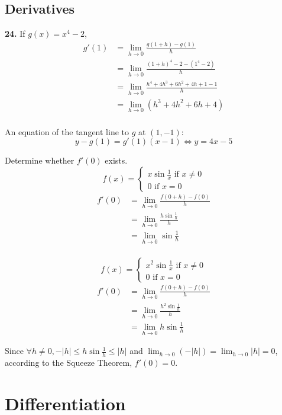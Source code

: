 \documentclass[a4paper,12pt]{article}
\begin{document}
\subsection{Derivatives}
\textbf{24. }If $g(x) = x^4 - 2$,
\begin{align*}
g'(1) &= \lim_{h \to 0}\frac{g(1 + h) - g(1)}{h}\\
      &= \lim_{h \to 0}\frac{(1 + h)^4 - 2 - (1^4 - 2)}{h}\\
      &= \lim_{h \to 0}\frac{h^4 + 4h^3 + 6h^2 + 4h + 1 - 1}{h}\\
      &= \lim_{h \to 0}(h^3 + 4h^2 + 6h + 4)\\
\end{align*}

An equation of the tangent line to $g$ at $(1, -1)$:
\[y - g(1) = g'(1)(x - 1) \iff y = 4x - 5\]

\noindent Determine whether $f'(0)$ exists.
\[f(x) = \begin{cases}
           x\sin\frac{1}{x}\text{ if } x \neq 0 \\
           0\text{ if } x = 0
         \end{cases}\tag{53}\]
\begin{align*}
f'(0) &= \lim_{h \to 0}\frac{f(0 + h) - f(0)}{h}\\
      &= \lim_{h \to 0}\frac{h\sin\frac{1}{h}}{h}\\
      &= \lim_{h \to 0}\sin\frac{1}{h}\tag{does not exist}\\
\end{align*}

\[f(x) = \begin{cases}
           x^2\sin\frac{1}{x}\text{ if } x \neq 0 \\
           0\text{ if } x = 0
         \end{cases}\tag{54}\]
\begin{align*}
f'(0) &= \lim_{h \to 0}\frac{f(0 + h) - f(0)}{h}\\
      &= \lim_{h \to 0}\frac{h^2\sin\frac{1}{h}}{h}\\
      &= \lim_{h \to 0}h\sin\frac{1}{h}
\end{align*}

Since $\forall h \neq 0, -|h| \leq h\sin\frac{1}{h} \leq |h|$
and $\lim_{h \to 0}(-|h|) = \lim_{h \to 0}|h| = 0$,
according to the Squeeze Theorem, $f'(0) = 0$.

\section{Differentiation}
\setcounter{subsection}{3}
\end{document}
